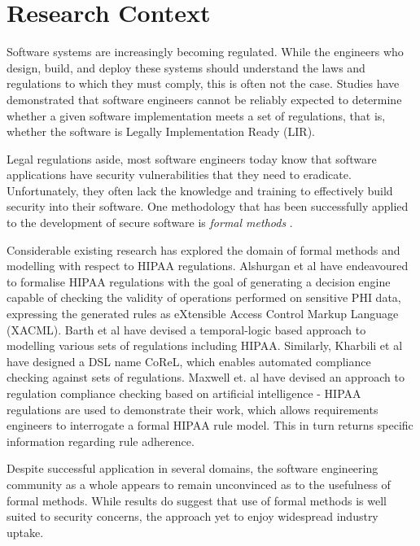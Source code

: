 \chapter{Research Context}

Software systems are increasingly becoming regulated. While the engineers who design, build, and deploy these systems should understand the laws and regulations to which they must comply\cite{RefMassey1}, this is often not the case. Studies have demonstrated that software engineers cannot be reliably expected to determine whether a given software implementation meets a set of regulations, that is, whether the software is Legally Implementation Ready (LIR)\cite{RefMassey1}.

Legal regulations aside, most software engineers today know that software applications have security vulnerabilities that they need to eradicate. Unfortunately, they often lack the knowledge and training to effectively build security into their software\cite{RefPayne1}. One methodology that has been successfully applied to the development of secure software is \textit{formal methods} \cite{RefVoas1}. 

Considerable existing research has explored the domain of formal methods and modelling with respect to HIPAA regulations. Alshurgan et al\cite{RefAlshugran1}\cite{RefAlshugran2} have endeavoured to formalise HIPAA regulations with the goal of generating a decision engine capable of checking the validity of operations performed on sensitive PHI data, expressing the generated rules as eXtensible Access Control Markup Language (XACML). Barth et al\cite{RefBarth1} have devised a temporal-logic based approach to modelling various sets of regulations including HIPAA. Similarly, Kharbili et al\cite{RefKharbili1} have designed a DSL name CoReL, which enables automated compliance checking against sets of regulations. Maxwell et. al have devised an approach to regulation compliance checking based on artificial intelligence - HIPAA regulations are used to demonstrate their work, which allows requirements engineers to interrogate a formal HIPAA rule model. This in turn returns specific information regarding rule adherence\cite{RefMaxwell1}.

Despite successful application in several domains\cite{Woodcock1}, the software engineering community as a whole appears to remain unconvinced as to the usefulness of formal methods\cite{RefBowen1}\cite{RefSchalken1}. While results do suggest that use of formal methods is well suited to security concerns\cite{RefSchaffer1}, the approach yet to enjoy widespread industry uptake\cite{Woodcock1}.

